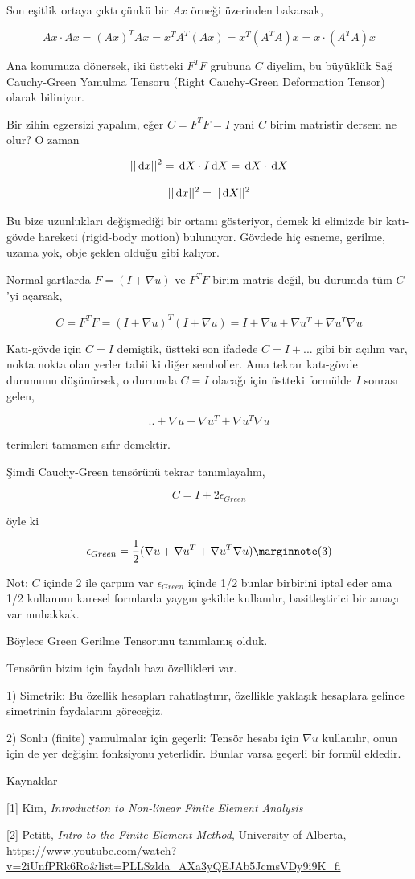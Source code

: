 \documentclass[12pt,fleqn]{article}\usepackage{../../common}
\begin{document}
Son eşitlik ortaya çıktı çünkü bir $Ax$ örneği üzerinden bakarsak,

$$
Ax \cdot Ax = (Ax)^T Ax = x^T A^T (Ax) = x^T (A^T A) x  = x \cdot (A^T A) x
$$

Ana konumuza dönersek, iki üstteki $F^T F$ grubuna $C$ diyelim, bu büyüklük
Sağ Cauchy-Green Yamulma Tensoru (Right Cauchy-Green Deformation Tensor)
olarak biliniyor.

Bir zihin egzersizi yapalım, eğer $C = F^T F = I$ yani $C$ birim matristir
dersem ne olur? O zaman

$$
||\,\mathrm{d} x||^2  = \,\mathrm{d} X \cdot I \,\mathrm{d} X = \,\mathrm{d} X \cdot \,\mathrm{d} X
$$

$$
||\,\mathrm{d} x||^2 = ||\,\mathrm{d} X||^2
$$

Bu bize uzunlukları değişmediği bir ortamı gösteriyor, demek ki elimizde
bir katı-gövde hareketi (rigid-body motion) bulunuyor. Gövdede hiç esneme,
gerilme, uzama yok, obje şeklen olduğu gibi kalıyor.

Normal şartlarda $F = (I+\nabla u)$ ve $F^T F$ birim matris değil, bu durumda
tüm $C$'yi açarsak,

$$
C = F^T F = (I+\nabla u)^T (I+\nabla u) =
I + \nabla u + \nabla u^T + \nabla u^T \nabla u
$$

Katı-gövde için $C = I$ demiştik, üstteki son ifadede $C = I + ...$  gibi
bir açılım var, nokta nokta olan yerler tabii ki diğer semboller. Ama
tekrar katı-gövde durumunu düşünürsek, o durumda $C = I$ olacağı için
üstteki formülde $I$ sonrası gelen,

$$
.. + \nabla u + \nabla u^T + \nabla u^T \nabla u
$$

terimleri tamamen sıfır demektir.

Şimdi Cauchy-Green tensörünü tekrar tanımlayalım,

$$
C = I + 2 \epsilon_{Green} 
$$

öyle ki 

$$
\epsilon_{Green} = \frac{1}{2} (\nabla u + \nabla u^T + \nabla u^T \nabla u )
\mlabel{3}
$$

Not: $C$ içinde 2 ile çarpım var $\epsilon_{Green}$ içinde 1/2 bunlar birbirini
iptal eder ama 1/2 kullanımı karesel formlarda yaygın şekilde kullanılır,
basitleştirici bir amaçı var muhakkak. 

Böylece Green Gerilme Tensorunu tanımlamış olduk.

Tensörün bizim için faydalı bazı özellikleri var.

1) Simetrik: Bu özellik hesapları rahatlaştırır, özellikle yaklaşık
hesaplara gelince simetrinin faydalarını göreceğiz. 

2) Sonlu (finite) yamulmalar için geçerli: Tensör hesabı için $\nabla u$
kullanılır, onun için de yer değişim fonksiyonu yeterlidir. Bunlar varsa geçerli
bir formül eldedir.

Kaynaklar

[1] Kim, {\em Introduction to Non-linear Finite Element Analysis}

[2] Petitt, {\em Intro to the Finite Element Method}, University of Alberta,
    \url{https://www.youtube.com/watch?v=2iUnfPRk6Ro&list=PLLSzlda_AXa3yQEJAb5JcmsVDy9i9K_fi}
\end{document}
